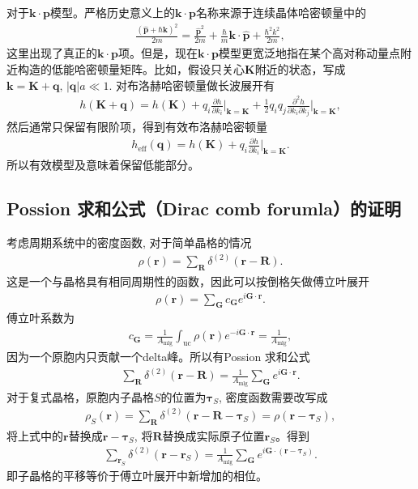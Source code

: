 \documentclass[10pt, oneside]{article}
\begin{document}
对于\(\bm{k} \cdot \bm{p}\)模型。严格历史意义上的\(\bm{k} \cdot \bm{p}\)名称来源于连续晶体哈密顿量中的
\begin{align}
	\frac{\left(\hat{\bm{p}}+ \hbar \bm{k}\right)^{2}}{2 m} = \frac{\hat{\bm{p}}^{2}}{2m} + \frac{\hbar}{m} \bm{k} \cdot \hat{\bm{p}} + \frac{\hbar^{2} k^{2}} {2m},
\end{align}
这里出现了真正的\(\bm{k} \cdot \bm{p}\)项。但是，现在\(\bm{k} \cdot \bm{p}\)模型更宽泛地指在某个高对称动量点附近构造的低能哈密顿量矩阵。比如，假设只关心\(\bm{K}\)附近的状态，写成\(\bm{k} = \bm{K} + \bm{q}, \, \left|\bm{q}\right| a \ll 1\). 对布洛赫哈密顿量做长波展开有
\begin{align}
	h \left(\bm{K} + \bm{q}\right) = h \left(\bm{K}\right) + q_i \frac{\partial h}{\partial k_i} \bigg|_{\bm{k} = \bm{K}} + \frac{1}{2} q_i q_j \frac{\partial^{2} h}{\partial k_i \partial k_j} \bigg|_{\bm{k} = \bm{K}} ,
\end{align}
然后通常只保留有限阶项，得到有效布洛赫哈密顿量
\begin{align}
	h_{\mathrm{eff}} \left(\bm{q}\right) = h \left(\bm{K}\right) + q_i \frac{\partial h}{\partial k_i} \bigg|_{\bm{k} = \bm{K}}.
\end{align}
所以有效模型及意味着保留低能部分。

\subsection{Possion 求和公式（Dirac comb forumla）的证明}
考虑周期系统中的密度函数, 对于简单晶格的情况
\begin{align}
	\rho \left(\bm{r}\right) = \sum_{\bm{R}} \delta^{\left(2\right)}  \left(\bm{r} - \bm{R}\right).
\end{align}
这是一个与晶格具有相同周期性的函数，因此可以按倒格矢做傅立叶展开
\begin{align}
	\rho \left(\bm{r}\right) = \sum_{\bm{G}} c_{\bm{G}} e^{i \bm{G}\cdot\bm{r}}.
\end{align}
傅立叶系数为
\begin{align}
	c_{\bm{G}} = \frac{1}{A_{\mathrm{mlg}}} \int_{\mathrm{uc}} \rho \left(\bm{r}\right) e^{-i \bm{G} \cdot \bm{r}} = \frac{1}{A_{\mathrm{mlg}}},
\end{align}
因为一个原胞内只贡献一个delta峰。所以有Possion 求和公式
\begin{align}
	\boxed{
		\sum_{\bm{R}} \delta^{\left(2\right)} \left(\bm{r} - \bm{R}\right)	= \frac{1}{A_{\mathrm{mlg}}} \sum_{\bm{G}} e^{i \bm{G} \cdot \bm{r}}.
	}
\end{align}
对于复式晶格，原胞内子晶格\(S\)的位置为\(\bm{\tau}_{S}\), 密度函数需要改写成
\begin{align}
	\rho_{S} \left(\bm{r}\right) = \sum_{\bm{R}} \delta^{\left(2\right)} \left(\bm{r} - \bm{R} - \bm{\tau}_{S}\right) = \rho \left(\bm{r} - \bm{\tau}_{S}\right),
\end{align}
将上式中的\(\bm{r}\)替换成\(\bm{r} - \bm{\tau}_{S}\), 将\(\bm{R}\)替换成实际原子位置\(\bm{r}_{S}\)。得到
\begin{align}
	\boxed{
		\sum_{\bm{r}_{S}} \delta^{\left(2\right)} \left(\bm{r} - \bm{r}_{S}\right) = \frac{1}{A_{\mathrm{mlg}}} \sum_{\bm{G}} e^{i \bm{G} \cdot \left(\bm{r} - \bm{\tau}_{S}\right)}.
	}
\end{align}
即子晶格的平移等价于傅立叶展开中新增加的相位。
\end{document}
